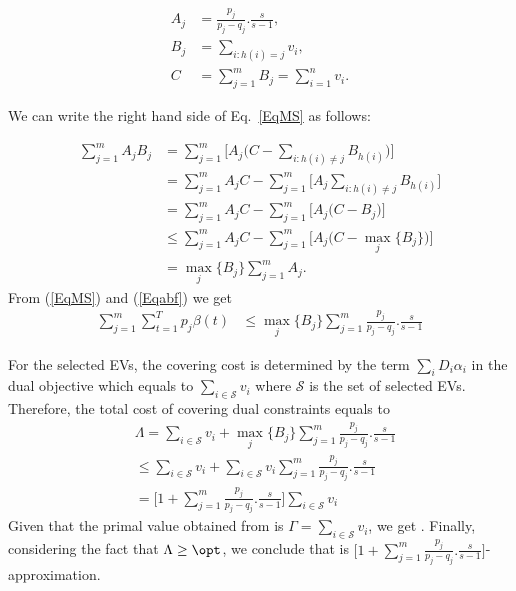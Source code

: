 			\begin{align} 
				A_j&=\frac{p_j}{p_j-q_j}.\frac{s}{s-1},\nonumber\\ 
				B_j&=\sum_{i:h(i)=j}v_i,\nonumber\\ 
				C&=\sum_{j=1}^m B_j=\sum_{i=1}^n v_i\nonumber. 
			\end{align}
			
			We can write the right hand side of Eq.~\eqref{EqMS} as follows:
			
			\begin{align}
				\sum_{j=1}^m A_jB_j&=\sum_{j=1}^m \Big[ A_j\big(C-\sum_{i:h(i)\neq j}B_{h(i)}\big)\Big]\nonumber\\
				&=\sum_{j=1}^m A_jC - \sum_{j=1}^m \Big[ A_j\sum_{i:h(i)\neq j}B_{h(i)} \Big]\nonumber\\
				&=\sum_{j=1}^m A_jC - \sum_{j=1}^m \Big[ A_j\big( C-B_{j}\big) \Big]\nonumber\\
				&\leq\sum_{j=1}^m A_jC- \sum_{j=1}^m \Big[ A_j\big( C-\max_j \{B_j\} \big) \Big]\nonumber\\
				&=\max_{j}\{B_{j}\} \sum_{j=1}^m A_j\label{Eqabf}.
			\end{align}
			From (\ref{EqMS}) and (\ref{Eqabf}) we get
			\begin{align}
				\sum_{j=1}^m \sum_{t=1}^T p_j\beta (t)&\leq \max_{j}\{B_{j}\}\sum_{j=1}^m{\frac{p_j}{p_j - q_j}}.\frac{s}{s-1}
			\end{align}
			
			
			For the selected EVs, the covering cost is determined by the term $\sum_{i} D_i\alpha _i$ in the dual objective which equals to $\sum_{i\in \mathcal{S}} v_i$ where $\mathcal{S}$ is the set of selected EVs. Therefore, the total cost of covering dual constraints equals to 
			\begin{align}
				&\Lambda =  \sum_{i\in \mathcal{S}}v_i + \max_{j}\{B_{j}\}\sum_{j=1}^{m}{\frac{p_j}{p_j-q_j}}.\frac{s}{s-1}\nonumber\\
				&\leq \sum_{i\in \mathcal{S}}v_i + \sum_{i\in \mathcal{S}}v_i\sum_{j=1}^{m}{\frac{p_j}{p_j-q_j}}.\frac{s}{s-1}\nonumber\\
				&=\Big[ 1+\sum_{j=1}^m{\frac{p_j}{p_j-q_j}}.\frac{s}{s-1}\Big] \sum_{i\in \mathcal{S}}v_i\label{Eq:bound}
			\end{align}
			Given that the primal value obtained from \ics is 
			${\Gamma = \sum_{i\in \mathcal{S}}v_i}$, we get 
			\bee
			\Lambda \leq \Big[ 1+\sum_{j=1}^m{\frac{p_j}{p_j-q_j}}.\frac{s}{s-1}\Big] \Gamma.
			\eee
			Finally, considering the fact that $\Lambda\geq\opt$, we conclude that \ics is $\Big[1+\sum_{j=1}^m{\frac{p_j}{p_j-q_j}}.\frac{s}{s-1}\Big]$-approximation.
			
